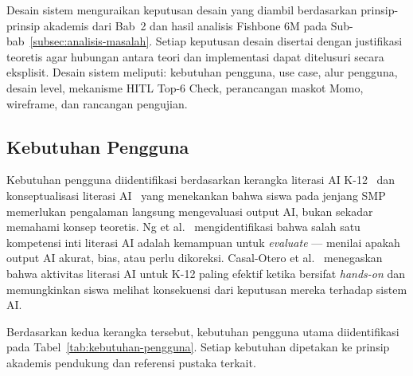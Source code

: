 \documentclass[12pt,a4paper,oneside,openany]{report}
\begin{document}
Desain sistem menguraikan keputusan desain yang diambil berdasarkan prinsip-prinsip akademis dari Bab~2 dan hasil analisis Fishbone 6M pada Sub-bab~\ref{subsec:analisis-masalah}. Setiap keputusan desain disertai dengan justifikasi teoretis agar hubungan antara teori dan implementasi dapat ditelusuri secara eksplisit. Desain sistem meliputi: kebutuhan pengguna, use case, alur pengguna, desain level, mekanisme HITL Top-6 Check, perancangan maskot Momo, wireframe, dan rancangan pengujian.

\subsection{Kebutuhan Pengguna}
\label{subsec:kebutuhan-pengguna}

Kebutuhan pengguna diidentifikasi berdasarkan kerangka literasi AI K-12~\cite{ref2} dan konseptualisasi literasi AI~\cite{ref1} yang menekankan bahwa siswa pada jenjang SMP memerlukan pengalaman langsung mengevaluasi output AI, bukan sekadar memahami konsep teoretis. Ng et al.~\cite{ref1} mengidentifikasi bahwa salah satu kompetensi inti literasi AI adalah kemampuan untuk \textit{evaluate} --- menilai apakah output AI akurat, bias, atau perlu dikoreksi. Casal-Otero et al.~\cite{ref2} menegaskan bahwa aktivitas literasi AI untuk K-12 paling efektif ketika bersifat \textit{hands-on} dan memungkinkan siswa melihat konsekuensi dari keputusan mereka terhadap sistem AI.

Berdasarkan kedua kerangka tersebut, kebutuhan pengguna utama diidentifikasi pada Tabel~\ref{tab:kebutuhan-pengguna}. Setiap kebutuhan dipetakan ke prinsip akademis pendukung dan referensi pustaka terkait.
\end{document}
